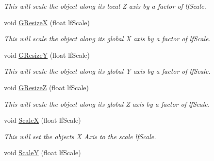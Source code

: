 \begin{DoxyCompactItemize}
\begin{DoxyCompactList}\small\item\em This will scale the object along its local Z axis by a factor of lfScale. \end{DoxyCompactList}\item 
\hypertarget{classc_matrix4_ac2be3e4653b0c8324c6a505e54544043}{
void \hyperlink{classc_matrix4_ac2be3e4653b0c8324c6a505e54544043}{GResizeX} (float lfScale)}
\label{classc_matrix4_ac2be3e4653b0c8324c6a505e54544043}

\begin{DoxyCompactList}\small\item\em This will scale the object along its global X axis by a factor of lfScale. \end{DoxyCompactList}\item 
\hypertarget{classc_matrix4_a13fda6e0dc1b19f7f136c1963bbdac77}{
void \hyperlink{classc_matrix4_a13fda6e0dc1b19f7f136c1963bbdac77}{GResizeY} (float lfScale)}
\label{classc_matrix4_a13fda6e0dc1b19f7f136c1963bbdac77}

\begin{DoxyCompactList}\small\item\em This will scale the object along its global Y axis by a factor of lfScale. \end{DoxyCompactList}\item 
\hypertarget{classc_matrix4_a74217e4c12e8f5623a572535ba443bc4}{
void \hyperlink{classc_matrix4_a74217e4c12e8f5623a572535ba443bc4}{GResizeZ} (float lfScale)}
\label{classc_matrix4_a74217e4c12e8f5623a572535ba443bc4}

\begin{DoxyCompactList}\small\item\em This will scale the object along its global Z axis by a factor of lfScale. \end{DoxyCompactList}\item 
\hypertarget{classc_matrix4_ab9bcc91e12de78a59b4d80c43c3e02ba}{
void \hyperlink{classc_matrix4_ab9bcc91e12de78a59b4d80c43c3e02ba}{ScaleX} (float lfScale)}
\label{classc_matrix4_ab9bcc91e12de78a59b4d80c43c3e02ba}

\begin{DoxyCompactList}\small\item\em This will set the objects X Axis to the scale lfScale. \end{DoxyCompactList}\item 
\hypertarget{classc_matrix4_a1f3a9e6f7112e30b1bdb8613fed6283b}{
void \hyperlink{classc_matrix4_a1f3a9e6f7112e30b1bdb8613fed6283b}{ScaleY} (float lfScale)}
\label{classc_matrix4_a1f3a9e6f7112e30b1bdb8613fed6283b}


\end{DoxyCompactItemize}
